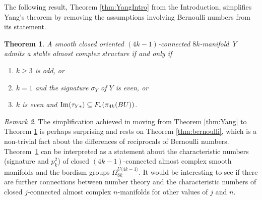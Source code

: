 \documentclass[12pt]{amsart}
\newcommand\im{\textup{Im}}
\newcommand{\an}[1]{\langle{#1}{\rangle}}
\newtheorem{Theorem}{Theorem}[section]
\theoremstyle{remark}
\newtheorem{Remark}[Theorem]{Remark}
\begin{document}
The following result, Theorem \ref{thm:YangIntro} from the Introduction,
simplifies Yang's theorem by removing the assumptions involving Bernoulli numbers from its statement.
\begin{Theorem} \label{thm:Yang+}
A smooth closed oriented $(4k{-}1)$-connected $8k$-manifold\,\,\,$Y$\! admits
a stable almost complex structure if and only if
\begin{enumerate}
\item $k\geq 3$ is odd, or
\item  $k=1$ and the  signature $\sigma_Y$ of $Y$  is even, or
\item $k$ is even and  $\im(\tau_{Y*}) \subseteq F_*(\pi_{4k}(BU))$.
\end{enumerate}
%
\end{Theorem}

\begin{Remark} \label{rem:Yang+}
The simplification achieved in moving from Theorem \ref{thm:Yang} to
Theorem \ref{thm:Yang+} is perhaps surprising and rests on Theorem
\ref{thm:bernoulli}, which is a non{-}trivial fact about the differences of
reciprocals of Bernoulli numbers. Theorem~\ref{thm:Yang+} can be interpreted as a
statement about the characteristic numbers (signature and $p_{k}^2$)
of closed $(4k{-}1)$-connected almost complex smooth manifolds and the
bordism groups $\Omega_{8k}^{U\an{4k{-}1}}$.  It would be interesting to
see if there are further connections between number theory and the
characteristic numbers of closed $j$-connected almost complex
$n$-manifolds for other values of $j$ and $n$.
\end{Remark}
\end{document}
